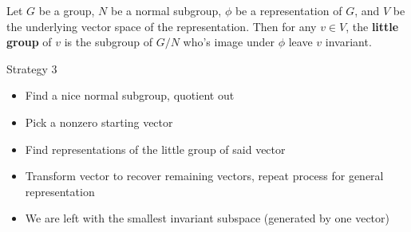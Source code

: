 \documentclass[compress,aspectratio=169,10pt,usenames,dvipsnames]{beamer}
\newcommand{\R}{\mathbb{R}}
\begin{document}
\begin{frame}
	\begin{definition}
	Let $G$ be a group, $N$ be a normal subgroup, $\phi$ be a representation of $G$, and $V$ be the underlying vector space of the representation. Then for any $v\in V$, the \textbf{little group} of $v$ is the subgroup of $G/N$ who's image under $\phi$ leave $v$ invariant.
\end{definition}
	\begin{block}{Strategy 3}
	\begin{itemize}
		\item Find a nice normal subgroup, quotient out
		\item Pick a nonzero starting vector
		\item Find representations of the little group of said vector
		\item Transform vector to recover remaining vectors, repeat process for general representation
		\item We are left with the smallest invariant subspace (generated by one vector)
	\end{itemize}
	\end{block}
\end{frame}
%
%
\end{document}
